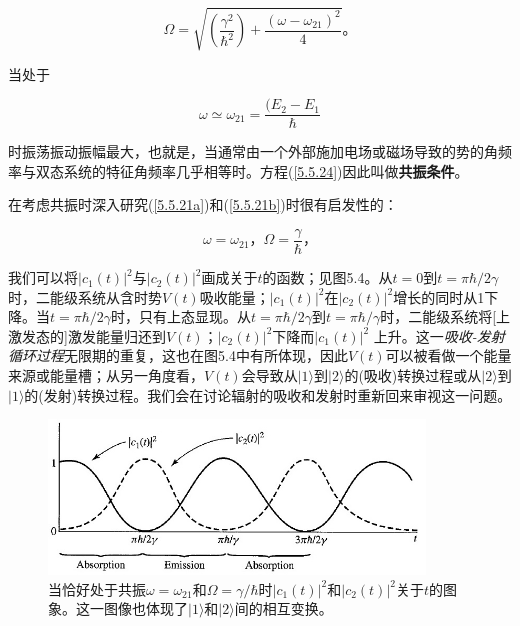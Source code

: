 ﻿\documentclass[UTF8,twoside]{ctexart}
\begin{document}
\begin{equation} \label{5.5.23}
\Omega=\sqrt{\left(\dfrac{\gamma^2}{\hbar^2}\right)+\dfrac{(\omega-\omega_{21})^2}{4}}\text{。}
\end{equation}

\noindent 当处于

\begin{equation} \label{5.5.24}
\omega\simeq\omega_{21}=\dfrac{(E_2-E_1}{\hbar}
\end{equation}

\noindent 时振荡振动振幅最大，也就是，当通常由一个外部施加电场或磁场导致的势的角频率与双态系统的特征角频率几乎相等时。方程(\ref{5.5.24})因此叫做\textbf{共振条件}。

在考虑共振时深入研究(\ref{5.5.21a})和(\ref{5.5.21b})时很有启发性的：

\begin{equation} \label{5.5.25}
\omega=\omega_{21}\text{，}\Omega=\dfrac{\gamma}{\hbar}\text{，}
\end{equation}

\noindent 我们可以将$|c_1(t)|^2$与$|c_2(t)|^2$画成关于$t$的函数；见图5.4。从$t=0$到$t=\pi\hbar/2\gamma$时，二能级系统从含时势$V(t)$吸收能量；$|c_1(t)|^2$在$|c_2(t)|^2$增长的同时从1下降。当$t=\pi\hbar/2\gamma$时，只有上态显现。从$t=\pi\hbar/2\gamma$到$t=\pi\hbar/\gamma$时，二能级系统将[上激发态的]激发能量归还到$V(t)$；$|c_2(t)|^2$下降而$|c_1(t)|^2$ 上升。这一\emph{吸收-发射循环过程}无限期的重复，这也在图5.4中有所体现，因此$V(t)$可以被看做一个能量来源或能量槽；从另一角度看，$V(t)$会导致从$|1\rangle$到$|2\rangle$的(吸收)转换过程或从$|2\rangle$到$|1\rangle$的(发射)转换过程。我们会在讨论辐射的吸收和发射时重新回来审视这一问题。

\begin{figure}
\begin{centering}
\includegraphics[width = 10cm]{./Graph/5.4.jpg}
\caption{当恰好处于共振$\omega=\omega_{21}$和$\Omega=\gamma/\hbar$时$|c_1(t)|^2$和$|c_2(t)|^2$关于$t$的图象。这一图像也体现了$|1\rangle$和$|2\rangle$间的相互变换。}
\label {Figure 5.4}
\end{centering}
\end{figure}
\end{document}
